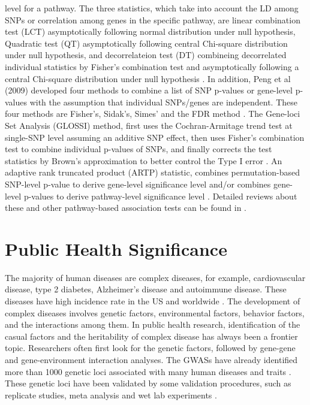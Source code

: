 \documentclass[12pt]{article}
\begin{document}
level for a pathway. The three statistics, which take into account the LD among SNPs or correlation among genes in the specific pathway, are linear combination test (LCT) asymptotically following normal distribution under null hypothesis, Quadratic test (QT) asymptotically following central Chi-square distribution under null hypothesis, and decorrelateion test (DT) combineing decorrelated individual statistics by Fisher's combination test and asymptotically following a central Chi-square distribution under null hypothesis \cite{Luo2010}. In addition, Peng et al (2009) developed four methods to combine a list of SNP p-values or gene-level p-values with the assumption that individual SNPs/genes are independent. These four methods are Fisher's, Sidak's, Simes' and the FDR method \cite{peng2009gene}. The Gene-loci Set Analysis (GLOSSI) method, first uses the Cochran-Armitage trend test at single-SNP level assuming an additive SNP effect, then uses Fisher's combination test to combine individual p-values of SNPs, and finally corrects the test statistics by Brown's approximation to better control the Type I error \cite{Chai2009}. An adaptive rank truncated product (ARTP) statistic, combines permutation-based SNP-level p-value to derive gene-level significance level and/or combines gene-level p-values to derive pathway-level significance level \cite{Yu2009}. Detailed reviews about these and other pathway-based association tests can be found in \cite{tintle2011inflated,Wang2010,Fridley2011}. 

\section{Public Health Significance}\label{sec:PHsig}
The majority of human diseases are complex diseases, for example, cardiovascular disease, type 2 diabetes, Alzheimer's disease and autoimmune disease. These diseases have high incidence rate in the US and worldwide 
\cite{Craig2008,Inzucchi2012,Go2013,Association2014,Benros2014}. The development of complex diseases involves genetic factors, environmental factors, behavior factors, and the interactions among them. In public health research, identification of the casual factors and the heritability of complex disease has always been a frontier topic. Researchers often first look for the genetic factors, followed by gene-gene and gene-environment interaction analyses.  The GWASs have already identified more than 1000 genetic loci associated with many human diseases and traits \cite{Hindorff2009}. These genetic loci have been validated by some validation procedures, such as replicate studies, meta analysis and wet lab experiments \cite{Wang2005,Hirschhorn2005,McCarthy2008,Hindorff2009,Cantor2010}. 
\end{document}
